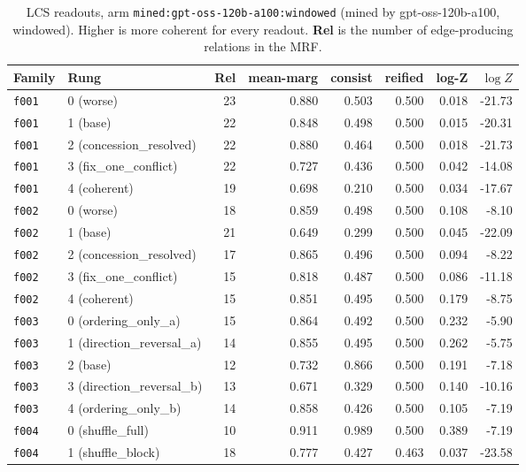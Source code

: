 \documentclass[11pt]{article}
\begin{document}
\begin{table}[htbp]
\centering
\small
\caption{LCS readouts, arm \texttt{mined:gpt-oss-120b-a100:windowed} (mined by gpt-oss-120b-a100, windowed). Higher is more coherent for every readout. \textbf{Rel} is the number of edge-producing relations in the MRF.}
\label{tab:scores-mined-gpt-oss-120b-a100-windowed}
\begin{tabular}{llrrrrrr}
\toprule
Family & Rung & Rel & \textbf{mean-marg} & \textbf{consist} & \textbf{reified} & \textbf{log-Z} & $\log Z$ \\
\midrule
\texttt{f001} & 0 (worse) & 23 & 0.880 & 0.503 & 0.500 & 0.018 & -21.73 \\
\texttt{f001} & 1 (base) & 22 & 0.848 & 0.498 & 0.500 & 0.015 & -20.31 \\
\texttt{f001} & 2 (concession\_resolved) & 22 & 0.880 & 0.464 & 0.500 & 0.018 & -21.73 \\
\texttt{f001} & 3 (fix\_one\_conflict) & 22 & 0.727 & 0.436 & 0.500 & 0.042 & -14.08 \\
\texttt{f001} & 4 (coherent) & 19 & 0.698 & 0.210 & 0.500 & 0.034 & -17.67 \\
\midrule
\texttt{f002} & 0 (worse) & 18 & 0.859 & 0.498 & 0.500 & 0.108 & -8.10 \\
\texttt{f002} & 1 (base) & 21 & 0.649 & 0.299 & 0.500 & 0.045 & -22.09 \\
\texttt{f002} & 2 (concession\_resolved) & 17 & 0.865 & 0.496 & 0.500 & 0.094 & -8.22 \\
\texttt{f002} & 3 (fix\_one\_conflict) & 15 & 0.818 & 0.487 & 0.500 & 0.086 & -11.18 \\
\texttt{f002} & 4 (coherent) & 15 & 0.851 & 0.495 & 0.500 & 0.179 & -8.75 \\
\midrule
\texttt{f003} & 0 (ordering\_only\_a) & 15 & 0.864 & 0.492 & 0.500 & 0.232 & -5.90 \\
\texttt{f003} & 1 (direction\_reversal\_a) & 14 & 0.855 & 0.495 & 0.500 & 0.262 & -5.75 \\
\texttt{f003} & 2 (base) & 12 & 0.732 & 0.866 & 0.500 & 0.191 & -7.18 \\
\texttt{f003} & 3 (direction\_reversal\_b) & 13 & 0.671 & 0.329 & 0.500 & 0.140 & -10.16 \\
\texttt{f003} & 4 (ordering\_only\_b) & 14 & 0.858 & 0.426 & 0.500 & 0.105 & -7.19 \\
\midrule
\texttt{f004} & 0 (shuffle\_full) & 10 & 0.911 & 0.989 & 0.500 & 0.389 & -7.19 \\
\texttt{f004} & 1 (shuffle\_block) & 18 & 0.777 & 0.427 & 0.463 & 0.037 & -23.58 \\

\end{tabular}
\end{table}
\end{document}
